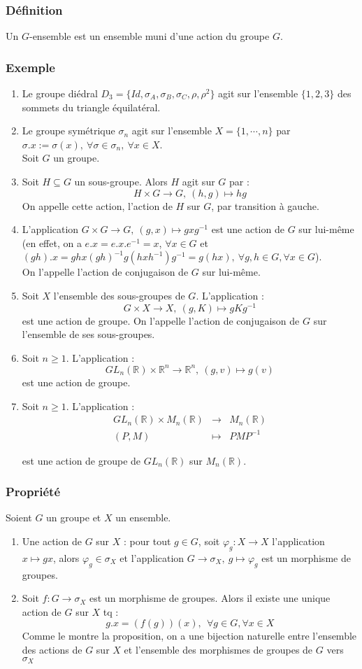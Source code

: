 \documentclass[a4paper, oneside]{report}
\newcommand{\x}{\times}
\newcommand{\R}{\mathbb{R}}
\newcommand{\propr}{\subsubsection{Propriété}}
\newcommand{\exem}{\subsubsection{Exemple}}
\begin{document}
\subsubsection{Définition}
Un $G$-ensemble est un ensemble muni d'une action du groupe $G$.

\exem
\begin{enumerate}
\item Le groupe diédral $D_3=\{Id, \sigma_A, \sigma_B, \sigma_C, \rho, \rho^2\}$ agit sur l'ensemble $\{1,2,3\}$ des sommets du triangle équilatéral.
\item Le groupe symétrique $\sigma_n$ agit sur l'ensemble $X=\{1,\cdots,n\}$ par $\sigma.x := \sigma(x), ~\forall \sigma \in \sigma_n,~\forall x\in X$.\\

Soit $G$ un groupe.
\item Soit $H\subseteq G$ un sous-groupe. Alors $H$ agit sur $G$ par :
$$H\x G \rightarrow G,~ (h,g)\mapsto hg$$
On appelle cette action, l'action de $H$ sur $G$, par transition à gauche.
\item L'application $G\x G \rightarrow G,~ (g,x) \mapsto gxg^{-1}$ est une action de $G$ sur lui-même (en effet, on a $e.x = e.x.e^{-1} =x$, $\forall x\in G$ et $(gh).x=ghx(gh)^{-1}g(hxh^{-1})g^{-1}=g(hx),~\forall g,h\in G, \forall x\in G$).\\
On l'appelle l'action de conjugaison de $G$ sur lui-même.
\item Soit $X$ l'ensemble des sous-groupes de $G$. L'application :
$$G\x X \rightarrow X,~(g,K)\mapsto gKg^{-1}$$
est une action de groupe. On l'appelle l'action de conjugaison de $G$ sur l'ensemble de ses sous-groupes.
\item Soit $n\geq 1$. L'application :
$$GL_n(\R)\x \R^n \rightarrow \R^n,~(g,v)\mapsto g(v)$$
est une action de groupe.
\item Soit $n\geq 1$. L'application :
$$\begin{array}{lll}
GL_n(\R)\x M_n(\R)&\rightarrow & M_n(\R)\\
(P,M)&\mapsto & PMP^{-1}
\end{array}$$

est une action de groupe de $GL_n(\R)$ sur $M_n(\R)$.
\end{enumerate}

\propr
Soient $G$ un groupe et $X$ un ensemble.
\begin{enumerate}
\item Une action de $G$ sur $X$ : pour tout $g\in G$, soit $\varphi_g :X \rightarrow X$ l'application $x\mapsto gx$, alors $\varphi_g \in \sigma_X$ et l'application $G\rightarrow \sigma_X,~g\mapsto \varphi_g$ est un morphisme de groupes.
\item Soit $f:G\rightarrow \sigma_X$ est un morphisme de groupes. Alors il existe une unique action de $G$ sur $X$ tq :
$$g.x = (f(g))(x),~~\forall g\in G,\forall x\in X$$
Comme le montre la proposition, on a une bijection naturelle entre l'ensemble des actions de $G$ sur $X$ et l'ensemble des morphismes de groupes de $G$ vers $\sigma_X$
\end{enumerate}
\end{document}
